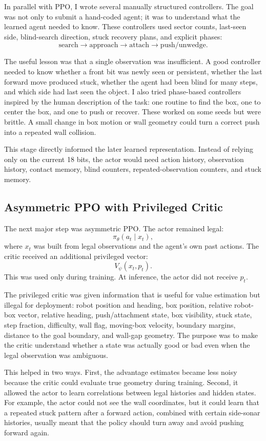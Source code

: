 \documentclass[11pt]{article}
\begin{document}
In parallel with PPO, I wrote several manually structured controllers. The goal was not
only to submit a hand-coded agent; it was to understand what the learned agent needed to
know. These controllers used sector counts, last-seen side, blind-search direction,
stuck recovery plans, and explicit phases:
\[
  \text{search} \rightarrow \text{approach} \rightarrow \text{attach} \rightarrow \text{push/unwedge}.
\]

The useful lesson was that a single observation was insufficient. A good controller
needed to know whether a front bit was newly seen or persistent, whether the last
forward move produced stuck, whether the agent had been blind for many steps, and which
side had last seen the object. I also tried phase-based controllers inspired by the
human description of the task: one routine to find the box, one to center the box, and
one to push or recover. These worked on some seeds but were brittle. A small change in
box motion or wall geometry could turn a correct push into a repeated wall collision.

This stage directly informed the later learned representation. Instead of relying only
on the current 18 bits, the actor would need action history, observation history,
contact memory, blind counters, repeated-observation counters, and stuck memory.

\subsection{Asymmetric PPO with Privileged Critic}

The next major step was asymmetric PPO. The actor remained legal:
\[
  \pi_\theta(a_t\mid x_t),
\]
where \(x_t\) was built from legal observations and the agent's own past actions. The
critic received an additional privileged vector:
\[
  V_\psi(x_t,p_t).
\]
This was used only during training. At inference, the actor did not receive \(p_t\).

The privileged critic was given information that is useful for value estimation but
illegal for deployment: robot position and heading, box position, relative robot-box
vector, relative heading, push/attachment state, box visibility, stuck state, step
fraction, difficulty, wall flag, moving-box velocity, boundary margins, distance to the
goal boundary, and wall-gap geometry. The purpose was to make the critic understand
whether a state was actually good or bad even when the legal observation was ambiguous.

This helped in two ways. First, the advantage estimates became less noisy because the
critic could evaluate true geometry during training. Second, it allowed the actor to
learn correlations between legal histories and hidden states. For example, the actor
could not see the wall coordinates, but it could learn that a repeated stuck pattern
after a forward action, combined with certain side-sonar histories, usually meant that
the policy should turn away and avoid pushing forward again.
\end{document}
